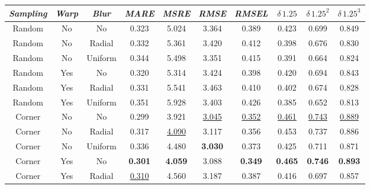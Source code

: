 \begin{table}
    \centering
    \begin{tabular}{c|c|c|c|c|c|c|c|c|c}
        \emph{Sampling} & \emph{Warp} & \emph{Blur} & \emph{MARE} & \emph{MSRE} & \emph{RMSE} & \emph{RMSEL} & \emph{$\delta \, 1.25$} & \emph{$\delta \, 1.25^{2}$} & \emph{$\delta \, 1.25^{3}$} \\
        \hline
        Random & No  & No      &             0.323  &            5.024  &            3.364  &            0.389  &            0.423  &            0.699  &            0.849  \\
        Random & No  & Radial  &             0.332  &            5.361  &            3.420  &            0.412  &            0.398  &            0.676  &            0.830  \\
        Random & No  & Uniform &             0.344  &            5.498  &            3.351  &            0.415  &            0.391  &            0.664  &            0.824  \\
        Random & Yes & No      &             0.320  &            5.314  &            3.424  &            0.398  &            0.420  &            0.694  &            0.843  \\
        Random & Yes & Radial  &             0.331  &            5.541  &            3.463  &            0.410  &            0.402  &            0.674  &            0.828  \\
        Random & Yes & Uniform &             0.351  &            5.928  &            3.403  &            0.426  &            0.385  &            0.652  &            0.813  \\
        Corner & No  & No      &             0.299  &            3.921  & \underline{3.045} & \underline{0.352} & \underline{0.461} & \underline{0.743} & \underline{0.889} \\
        Corner & No  & Radial  &             0.317  & \underline{4.090} &            3.117  &            0.356  &            0.453  &            0.737  &            0.886  \\
        Corner & No  & Uniform &             0.336  &            4.480  &    \textbf{3.030} &            0.373  &            0.425  &            0.711  &            0.871  \\
        Corner & Yes & No      &     \textbf{0.301} &    \textbf{4.059} &            3.088  &    \textbf{0.349} &    \textbf{0.465} &    \textbf{0.746} &    \textbf{0.893} \\
        Corner & Yes & Radial  &  \underline{0.310} &            4.560  &            3.187  &            0.387  &            0.416  &            0.697  &            0.857  \\

\end{tabular}
\end{table}
